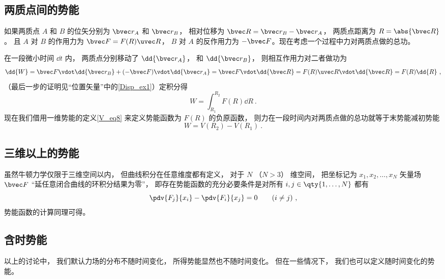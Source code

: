 \subsection{两质点间的势能}

如果两质点 $A$ 和 $B$ 的位矢分别为 $\bvec r_A$ 和 $\bvec r_B$， 相对位移为 $\bvec R = \bvec r_B - \bvec r_A$， 两质点距离为 $R = \abs{\bvec R}$。 且 $A$ 对 $B$ 的作用力为 $\bvec F = F(R) \uvec R$， $B$ 对 $A$ 的反作用力为 $-\bvec F$。现在考虑一个过程中力对两质点做的总功。

在一段微小时间 $\dd{t}$ 内， 两质点分别移动了 $\dd{\bvec r_A}$， 和 $\dd{\bvec r_B}$， 则相互作用力对二者做功为
\begin{equation}
\dd{W} = \bvec F \vdot \dd{\bvec r_B} + (- \bvec F) \vdot \dd{\bvec r_A} = \bvec F \vdot \dd{\bvec R}
= F(R)\uvec R\vdot \dd{\bvec R} = F(R) \dd{R}~,
\end{equation}
（最后一步的证明见“位置矢量”中的\autoref{Disp_ex1}）定积分得
\begin{equation}
W = \int_{R_1}^{R_2}  F(R) \dd{R}~.
\end{equation}
现在我们借用一维势能的定义\autoref{V_eq8} 来定义势能函数为 $F(R)$ 的负原函数， 则力在一段时间内对两质点做的总功就等于末势能减初势能
\begin{equation}\label{V_eq20}
W = V(R_2) - V(R_1)~.
\end{equation}

\subsection{三维以上的势能}
虽然牛顿力学仅限于三维空间以内， 但曲线积分在任意维度都有定义， 对于 $N$ （$N > 3$） 维空间， 把坐标记为 $x_1, x_2, \dots, x_N$ 矢量场 $\bvec F$ “延任意闭合曲线的环积分结果为零”， 即存在势能函数的充分必要条件是对所有 $i,j \in \qty{1,\dots, N}$ 都有
\begin{equation}
\pdv{F_j}{x_i} - \pdv{F_i}{x_j} = 0 \qquad (i\ne j)~,
\end{equation}
势能函数的计算同理可得。

\subsection{含时势能}
以上的讨论中， 我们默认力场的分布不随时间变化， 所得势能显然也不随时间变化。 但在一些情况下， 我们也可以定义随时间变化的势能。



